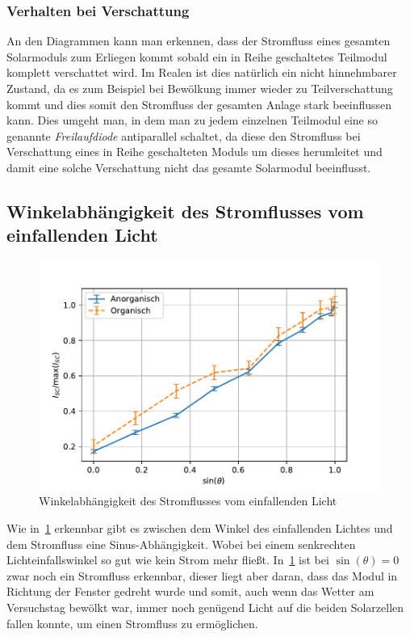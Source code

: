 \documentclass[slug=SZ, room=Hermann-Krone-Bau\,\ Labor\ 1.25, supervisor=Martin\ Kroll]{../../Lab_Report_LaTeX/lab_report}
\begin{document}
\subsubsection{Verhalten bei Verschattung}
\label{sec:verschattung}

An den Diagrammen kann man erkennen, dass der Stromfluss eines gesamten Solarmoduls
zum Erliegen kommt sobald ein in Reihe geschaltetes Teilmodul komplett verschattet wird.
Im Realen ist dies natürlich ein nicht hinnehmbarer Zustand, da es zum Beispiel bei
Bewölkung immer wieder zu Teilverschattung kommt und dies somit den Stromfluss der gesamten
Anlage stark beeinflussen kann.
Dies umgeht man, in dem man zu jedem einzelnen Teilmodul eine so genannte \emph{Freilaufdiode}
antiparallel schaltet, da diese den Stromfluss bei Verschattung eines in Reihe geschalteten
Moduls um dieses herumleitet und damit eine solche Verschattung nicht das gesamte
Solarmodul beeinflusst.

\subsection{Winkelabhängigkeit des Stromflusses vom einfallenden Licht}
\label{sec:winkel}

\begin{figure}[H]\centering
        \includegraphics[width=.5\columnwidth]{figs/python/E/relativ.pdf}
        \caption{Winkelabhängigkeit des Stromflusses vom einfallenden Licht}
        \label{fig:winkel}
\end{figure}

Wie in~\ref{fig:winkel} erkennbar gibt es zwischen dem Winkel des einfallenden
Lichtes und dem Stromfluss eine Sinus-Abhängigkeit. Wobei bei einem senkrechten
Lichteinfallswinkel so gut wie kein Strom mehr fließt.
In~\ref{fig:winkel} ist bei \(\sin(\theta) = 0\) zwar noch ein Stromfluss erkennbar,
dieser liegt aber daran, dass das Modul in Richtung der Fenster gedreht wurde und somit,
auch wenn das Wetter am Versuchstag bewölkt war, immer noch genügend Licht auf die beiden
Solarzellen fallen konnte, um einen Stromfluss zu ermöglichen.
\end{document}
